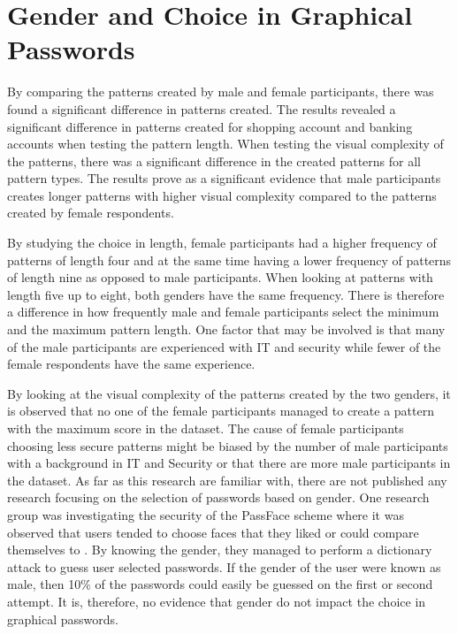   \section{Gender and Choice in Graphical Passwords}

    By comparing the patterns created by male and female participants, there was found a significant difference in patterns created. The results revealed a significant difference in patterns created for shopping account and banking accounts when testing the pattern length. When testing the visual complexity of the patterns, there was a significant difference in the created patterns for all pattern types. The results prove as a significant evidence that male participants creates longer patterns with higher visual complexity compared to the patterns created by female respondents.

    By studying the choice in length, female participants had a higher frequency of patterns of length four and at the same time having a lower frequency of patterns of length nine as opposed to male participants. When looking at patterns with length five up to eight, both genders have the same frequency. There is therefore a difference in how frequently male and female participants select the minimum and the maximum pattern length. One factor that may be involved is that many of the male participants are experienced with IT and security while fewer of the female respondents have the same experience. 

    By looking at the visual complexity of the patterns created by the two genders, it is observed that no one of the female participants managed to create a pattern with the maximum score in the dataset.  The cause of female participants choosing less secure patterns might be biased by the number of male participants with a background in IT and Security or that there are more male participants in the dataset.  As far as this research are familiar with, there are not published any research focusing on the selection of passwords based on gender. One research group was investigating the security of the PassFace scheme where it was observed that users tended to choose faces that they liked or could compare themselves to \cite{Davis}. By knowing the gender, they managed to perform a dictionary attack to guess user selected passwords. If the gender of the user were known as male, then 10\% of the passwords could easily be guessed on the first or second attempt. It is, therefore, no evidence that gender do not impact the choice in graphical passwords. 
    
